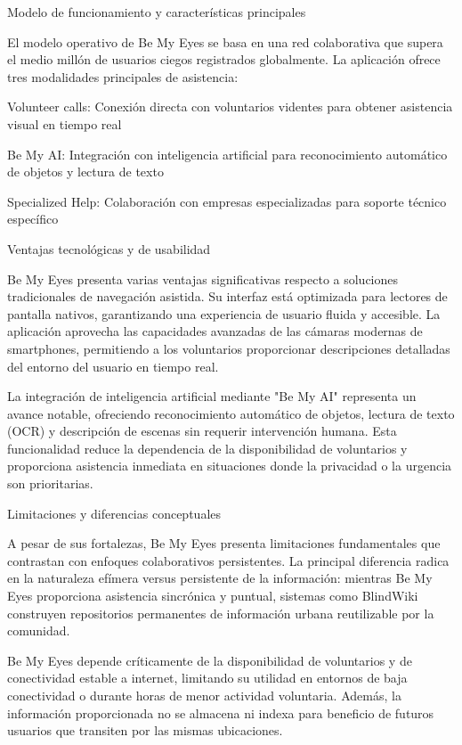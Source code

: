 Modelo de funcionamiento y características principales

El modelo operativo de Be My Eyes se basa en una red colaborativa que supera el medio millón de usuarios ciegos registrados globalmente. La aplicación ofrece tres modalidades principales de asistencia:

Volunteer calls: Conexión directa con voluntarios videntes para obtener asistencia visual en tiempo real

Be My AI: Integración con inteligencia artificial para reconocimiento automático de objetos y lectura de texto

Specialized Help: Colaboración con empresas especializadas para soporte técnico específico

Ventajas tecnológicas y de usabilidad

Be My Eyes presenta varias ventajas significativas respecto a soluciones tradicionales de navegación asistida. Su interfaz está optimizada para lectores de pantalla nativos, garantizando una experiencia de usuario fluida y accesible. La aplicación aprovecha las capacidades avanzadas de las cámaras modernas de smartphones, permitiendo a los voluntarios proporcionar descripciones detalladas del entorno del usuario en tiempo real.

La integración de inteligencia artificial mediante "Be My AI" representa un avance notable, ofreciendo reconocimiento automático de objetos, lectura de texto (OCR) y descripción de escenas sin requerir intervención humana. Esta funcionalidad reduce la dependencia de la disponibilidad de voluntarios y proporciona asistencia inmediata en situaciones donde la privacidad o la urgencia son prioritarias.

Limitaciones y diferencias conceptuales

A pesar de sus fortalezas, Be My Eyes presenta limitaciones fundamentales que contrastan con enfoques colaborativos persistentes. La principal diferencia radica en la naturaleza efímera versus persistente de la información: mientras Be My Eyes proporciona asistencia sincrónica y puntual, sistemas como BlindWiki construyen repositorios permanentes de información urbana reutilizable por la comunidad.

Be My Eyes depende críticamente de la disponibilidad de voluntarios y de conectividad estable a internet, limitando su utilidad en entornos de baja conectividad o durante horas de menor actividad voluntaria. Además, la información proporcionada no se almacena ni indexa para beneficio de futuros usuarios que transiten por las mismas ubicaciones.


